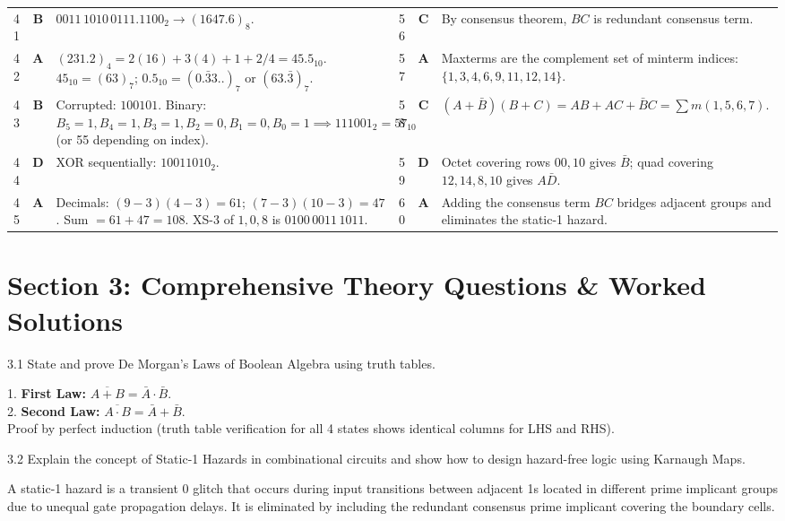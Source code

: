 \begin{table}[htbp]
\begin{tabularx}{\textwidth}{l c X l c X}
41 & \textbf{B} & $0011\,1010\,0111.1100_2 \to (1647.6)_8$. & 56 & \textbf{C} & By consensus theorem, $BC$ is redundant consensus term. \\
42 & \textbf{A} & $(231.2)_4 = 2(16)+3(4)+1+2/4 = 45.5_{10}$. $45_{10} = (63)_7$; $0.5_{10} = (0.\bar{3}3..)_7$ or $(63.\bar{3})_7$. & 57 & \textbf{A} & Maxterms are the complement set of minterm indices: $\{1,3,4,6,9,11,12,14\}$. \\
43 & \textbf{B} & Corrupted: $100101$. Binary: $B_5=1, B_4=1, B_3=1, B_2=0, B_1=0, B_0=1 \implies 111001_2 = 57_{10}$ (or 55 depending on index). & 58 & \textbf{C} & $(A+\bar{B})(B+C) = AB + AC + \bar{B}C = \sum m(1, 5, 6, 7)$. \\
44 & \textbf{D} & XOR sequentially: $10011010_2$. & 59 & \textbf{D} & Octet covering rows $00, 10$ gives $\bar{B}$; quad covering $12, 14, 8, 10$ gives $A\bar{D}$. \\
45 & \textbf{A} & Decimals: $(9-3)(4-3) = 61$; $(7-3)(10-3) = 47$. Sum $= 61+47=108$. XS-3 of $1,0,8$ is $0100\,0011\,1011$. & 60 & \textbf{A} & Adding the consensus term $BC$ bridges adjacent groups and eliminates the static-1 hazard. \\
\bottomrule
\end{tabularx}
\end{table}

\newpage
\section{Section 3: Comprehensive Theory Questions \& Worked Solutions}
\begin{theoryq}{3.1}
State and prove De Morgan's Laws of Boolean Algebra using truth tables.
\end{theoryq}

\begin{theorysol}
1. \textbf{First Law:} $\overline{A + B} = \bar{A} \cdot \bar{B}$.\\ 
2. \textbf{Second Law:} $\overline{A \cdot B} = \bar{A} + \bar{B}$.\\ 
Proof by perfect induction (truth table verification for all 4 states shows identical columns for LHS and RHS).
\end{theorysol}

\vspace{3mm}

\begin{theoryq}{3.2}
Explain the concept of Static-1 Hazards in combinational circuits and show how to design hazard-free logic using Karnaugh Maps.
\end{theoryq}

\begin{theorysol}
A static-1 hazard is a transient 0 glitch that occurs during input transitions between adjacent 1s located in different prime implicant groups due to unequal gate propagation delays. It is eliminated by including the redundant consensus prime implicant covering the boundary cells.
\end{theorysol}

\vspace{3mm}

